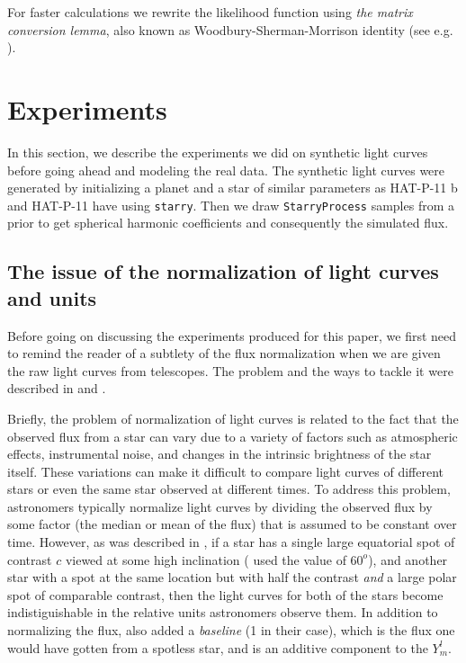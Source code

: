 \documentclass[twocolumn]{aastex631}
\begin{document}
For faster calculations we rewrite the likelihood function using \emph{the matrix conversion lemma}, also known as 
Woodbury-Sherman-Morrison identity (see e.g. \cite{Hogg2020}).


\section{Experiments}
In this section, we describe the experiments we did on synthetic light curves before going ahead and modeling the real data. The synthetic light curves were 
generated by initializing a planet and a star of similar parameters as HAT-P-11 b and HAT-P-11 have using \texttt{starry}. Then we draw \texttt{StarryProcess} 
samples from a prior to get spherical harmonic coefficients and consequently the simulated flux. 

\subsection{The issue of the normalization of light curves and units}
Before going on discussing the experiments produced for this paper, we first need to remind the reader of a subtlety of the flux normalization when we are given
the raw light curves from telescopes. The problem and the ways to tackle it were described in \cite{Luger2021a} and \cite{Luger2021b}. 

Briefly, the problem of normalization of light curves is related to the fact that the observed flux from a star can vary due to a variety of factors 
such as atmospheric effects, instrumental noise, and changes in the intrinsic brightness of the star itself. These variations can make it difficult 
to compare light curves of different stars or even the same star observed at different times. To address this problem, astronomers typically normalize 
light curves by dividing the observed flux by some factor (the median or mean of the flux) that is assumed to be constant over time. 
However, as was described in \cite{Luger2021a}, if a star has a single large equatorial spot of contrast $c$ viewed at some high inclination 
(\cite{Luger2021a} used the value of $60^o$), and another star with a spot at the same location but with half the contrast \emph{and} a large polar spot of 
comparable contrast, then the light curves for both of the stars become indistiguishable in the relative units astronomers observe them. In addition to normalizing 
the flux, \cite{Luger2021a} also added a \emph{baseline} (1 in their case), which is the flux one would have gotten from a spotless star, 
and is an additive component to the $Y_m^l$.
\end{document}

